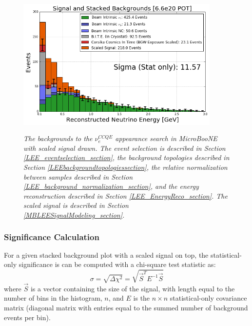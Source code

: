 \begin{figure}[ht!]
\centering
\includegraphics[width=0.9\textwidth]{Figures/LEE_perfectreco_fullstack_WithAnalysisCuts.png}\\
\caption{\textit{The backgrounds to the $\nu_e^{CCQE}$ appearance search in MicroBooNE with scaled signal drawn. The event selection is described in Section \ref{LEE_eventselection_section}, the background topologies described in Section \ref{LEEbackgroundtopologiessection}, the relative normalization between samples described in Section \ref{LEE_background_normalization_section}, and the energy reconstruction described in Section \ref{LEE_EnergyReco_section}. The scaled signal is described in Section \ref{MBLEESignalModeling_section}.}}
\label{LEE_perfectreco_fullstack_fig}
\end{figure}

\subsubsection{Significance Calculation}
For a given stacked background plot with a scaled signal on top, the statistical-only significance is can be computed with a chi-square test statistic as:
\begin{equation}\label{chisquaresigeqtn}
\sigma = \sqrt{\Delta \chi^2} = \sqrt{\vec{S}^TE^{-1}\vec{S}}
\end{equation}
where $\vec{S}$ is a vector containing the size of the signal, with length equal to the number of bins in the histogram, $n$, and $E$ is the $n\times n$ statistical-only covariance matrix (diagonal matrix with entries equal to the summed number of background events per bin).


